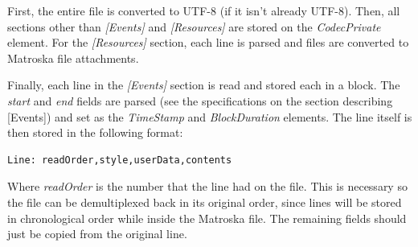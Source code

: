 \documentclass{spec}
\begin{document}
First, the entire file is converted to UTF-8 (if it isn't already UTF-8). Then, all sections other
than \emph{[Events]} and \emph{[Resources]} are stored on the \emph{CodecPrivate} element. For the
\emph{[Resources]} section, each line is parsed and files are converted to Matroska file attachments.

Finally, each line in the \emph{[Events]} section is read and stored each in a block. The \emph{start}
and \emph{end} fields are parsed (see the specifications on the section describing [Events]) and set
as the \emph{TimeStamp} and \emph{BlockDuration} elements. The line itself is then stored in the
following format:

\begin{verbatim}
Line: readOrder,style,userData,contents
\end{verbatim}

Where \emph{readOrder} is the number that the line had on the file. This is necessary so the file
can be demultiplexed back in its original order, since lines will be stored in chronological order
while inside the Matroska file. The remaining fields should just be copied from the original line.
\end{document}
